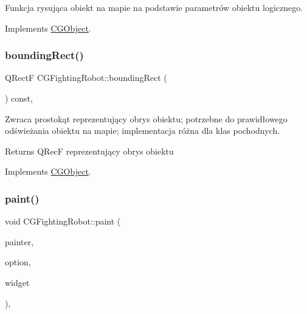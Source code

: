 Funkcja rysująca obiekt na mapie na podstawie parametrów obiektu logicznego. 



Implements \mbox{\hyperlink{class_c_g_object_a859e765fbb3ab0d6ad73ca58e5e49779}{C\+G\+Object}}.

\mbox{\label{class_c_g_fighting_robot_a945d974c6e61507a9f671ab7288df85a}} 
\subsubsection{\texorpdfstring{bounding\+Rect()}{boundingRect()}}
{\footnotesize\ttfamily Q\+RectF C\+G\+Fighting\+Robot\+::bounding\+Rect (\begin{DoxyParamCaption}{ }\end{DoxyParamCaption}) const\hspace{0.3cm}{\ttfamily [override]}, {\ttfamily [virtual]}}



Zwraca prostokąt reprezentujący obrys obiektu; potrzebne do prawidłowego odświeżania obiektu na mapie; implementacja różna dla klas pochodnych. 

\begin{DoxyReturn}{Returns}
Q\+RecF reprezentujący obrys obiektu 
\end{DoxyReturn}


Implements \mbox{\hyperlink{class_c_g_object_ab9edf3d10a53c254cdb5d3d8de930207}{C\+G\+Object}}.

\mbox{\label{class_c_g_fighting_robot_ad269a29840cb25ecb91f5a3c609ff4dd}} 
\subsubsection{\texorpdfstring{paint()}{paint()}}
{\footnotesize\ttfamily void C\+G\+Fighting\+Robot\+::paint (\begin{DoxyParamCaption}\item[{Q\+Painter $\ast$}]{painter,  }\item[{const Q\+Style\+Option\+Graphics\+Item $\ast$}]{option,  }\item[{Q\+Widget $\ast$}]{widget }\end{DoxyParamCaption})\hspace{0.3cm}{\ttfamily [override]}, {\ttfamily [virtual]}}



